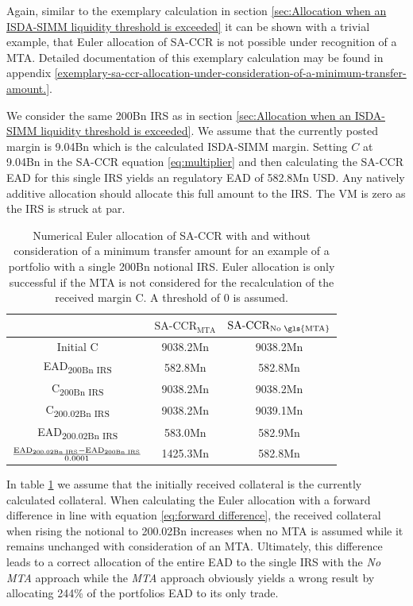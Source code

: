\documentclass[../Thesis_AHoecherl.tex]{subfiles}
\begin{document}
    Again, similar to the exemplary calculation in section \ref{sec:Allocation when an ISDA-SIMM liquidity threshold is exceeded} it can be shown with a trivial example, that Euler allocation of SA-CCR is not possible under recognition of a \gls{MTA}. Detailed documentation of this exemplary calculation may be found in appendix \ref{exemplary-sa-ccr-allocation-under-consideration-of-a-minimum-transfer-amount.}.
    
    We consider the same 200Bn \gls{IRS} as in section \ref{sec:Allocation when an ISDA-SIMM liquidity threshold is exceeded}. We assume that the currently posted margin is 9.04Bn which is the calculated ISDA-SIMM margin. 
    Setting $C$ at 9.04Bn in the SA-CCR equation \ref{eq:multiplier} and then calculating the SA-CCR EAD for this single IRS yields an regulatory EAD of 582.8Mn USD. Any natively additive allocation should allocate this full amount to the IRS.
    The \gls{VM} is zero as the IRS is struck at par.
    \begin{table}[htbp]
        \centering
        \begin{tabular}{c|c|c}
            & $\text{SA-CCR}_{\text{MTA}}$ & $\text{SA-CCR}_{\text{No \gls{MTA}}}$ \\
            \toprule
            Initial C & 9038.2Mn & 9038.2Mn \\
            \midrule
            EAD\textsubscript{200Bn IRS} & 582.8Mn & 582.8Mn \\
            \midrule
            C\textsubscript{200Bn IRS} & 9038.2Mn & 9038.2Mn \\
            \midrule
            C\textsubscript{200.02Bn IRS} & 9038.2Mn & 9039.1Mn \\
            \midrule
            EAD\textsubscript{200.02Bn IRS} & 583.0Mn & 582.9Mn \\
            \midrule
            $\frac{\text{EAD\textsubscript{200.02Bn IRS}}-\text{EAD\textsubscript{200Bn IRS}}}{0.0001}$ & 1425.3Mn & 582.8Mn  \\
        \end{tabular}%
        \caption{Numerical Euler allocation of SA-CCR with and without consideration of a minimum transfer amount for an example of a portfolio with a single 200Bn notional IRS. Euler allocation is only successful if the \gls{MTA} is not considered for the recalculation of the received margin C. A threshold of 0 is assumed.}
        \label{tab:Allocate SA-CCR with MTA calculation}
    \end{table}
    In table \ref{tab:Allocate SA-CCR with MTA calculation} we assume that the initially received collateral is the currently calculated collateral. 
    When calculating the Euler allocation with a forward difference  in line with equation \ref{eq:forward difference}, the received collateral when rising the notional to 200.02Bn increases when no MTA is assumed while it remains unchanged with consideration of an MTA. 
    Ultimately, this difference leads to a correct allocation of the entire EAD to the single IRS with the \emph{No MTA} approach while the \emph{MTA} approach obviously yields a wrong result by allocating 244\% of the portfolios EAD to its only trade.
\end{document}

